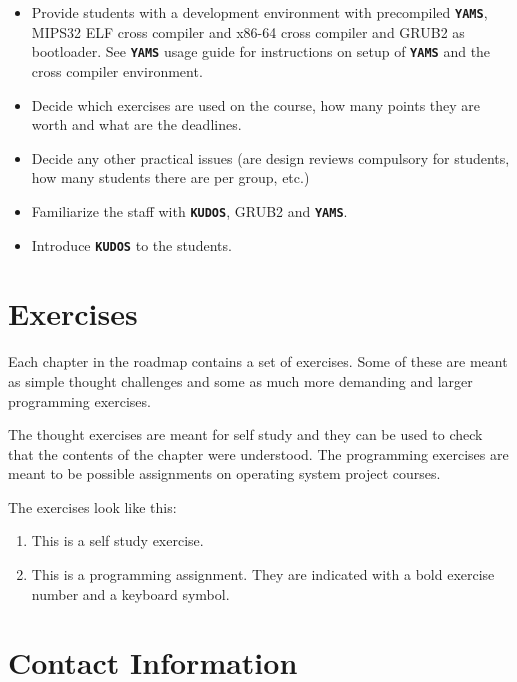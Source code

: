 \documentclass[twoside,a4paper]{report}
\newcommand{\kudos}{\texttt{\textbf{KUDOS}}}
\newcommand{\yams}{\texttt{\textbf{YAMS}}}
\newenvironment{exercises}[1][\addcontentsline{toc}{section}{Exercises}%
\section*{Exercises}\markright{EXERCISES}]{%
#1%
\begin{enumerate}%
}{%
\end{enumerate}
}
\newcounter{exercisec}[chapter]
\newcommand{\exercise}[1]{%
\item[\stepcounter{exercisec}\arabic{chapter}.\theexercisec{}.] #1%
}
\newcommand{\cexercise}[1]{%
\item[\stepcounter{exercisec}{\huge\Keyboard}\hspace{5mm}\textbf{\arabic{chapter}.\theexercisec{}.}] #1%
}
\begin{document}
\begin{itemize}

\item Provide students with a development environment with precompiled
\yams{}, MIPS32 ELF cross compiler and x86-64 cross compiler and GRUB2 as bootloader. 
See \yams{} usage guide for instructions on setup of \yams{} and 
the cross compiler environment.

\item Decide which exercises are used on the course, how many points
they are worth and what are the deadlines.

\item Decide any other practical issues (are design reviews compulsory
for students, how many students there are per group, etc.)

\item Familiarize the staff with \kudos{}, GRUB2 and \yams{}.

\item Introduce \kudos{} to the students.

\end{itemize}

\section{Exercises}
\label{sec:exercises}

Each chapter in the roadmap contains a set of exercises. Some of
these are meant as simple thought challenges and some as much more
demanding and larger programming exercises.

The thought exercises are meant for self study and they can be used to
check that the contents of the chapter were understood. The
programming exercises are meant to be possible assignments on
operating system project courses.

The exercises look like this:

\begin{exercises}[\vspace{\baselineskip}]

\exercise{This is a self study exercise.}

\cexercise{This is a programming assignment. They are indicated with a
bold exercise number and a keyboard symbol.}

\end{exercises}

\section{Contact Information}
\end{document}
